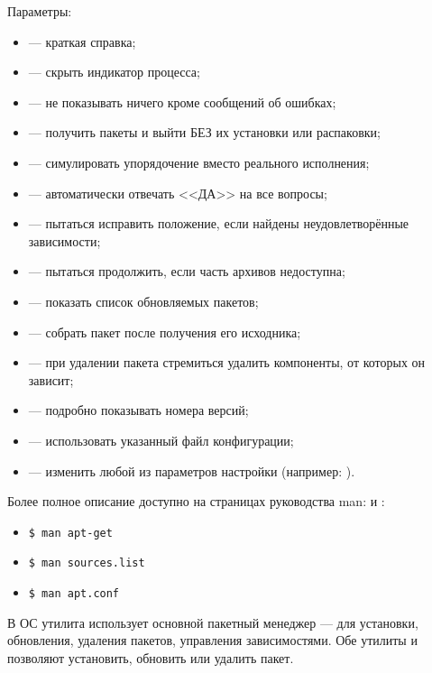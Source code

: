 Параметры:
\begin{itemize}
	\item {} --- краткая справка;
	\item {} --- скрыть индикатор процесса;
	\item {}--- не показывать ничего кроме сообщений об ошибках;
	\item {} --- получить пакеты и выйти БЕЗ их установки или распаковки;
	\item {} --- симулировать упорядочение вместо реального исполнения;
	\item {} --- автоматически отвечать <<ДА>> на все вопросы;
	\item {} --- пытаться исправить положение, если найдены неудовлетворённые зависимости;
	\item {} --- пытаться продолжить, если часть архивов недоступна;
	\item {} --- показать список обновляемых пакетов;
	\item {} --- собрать пакет после получения его исходника;
	\item {} --- при удалении пакета стремиться удалить компоненты, от которых он зависит;
	\item {} --- подробно показывать номера версий;
	\item {} --- использовать указанный файл конфигурации;
	\item {} --- изменить любой из параметров настройки (например: ).
\end{itemize}

Более полное описание доступно на страницах руководства man:
 и :
\begin{itemize}
	\item\begin{verbatim}$ man apt-get\end{verbatim}
	\item\begin{verbatim}$ man sources.list\end{verbatim}
	\item\begin{verbatim}$ man apt.conf\end{verbatim}
\end{itemize}

В ОС  утилита  использует основной пакетный менеджер  ---
 для установки, обновления, удаления пакетов, управления зависимостями. Обе
утилиты  и  позволяют установить, обновить или удалить пакет.

